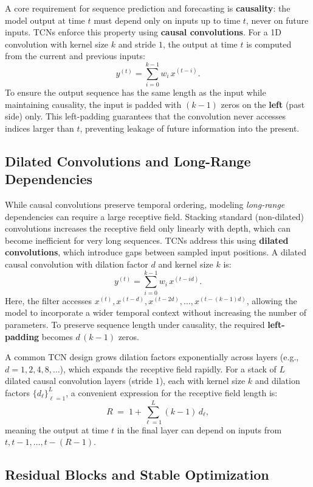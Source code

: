 \documentclass{article}
\begin{document}
A core requirement for sequence prediction and forecasting is \textbf{causality}: the model output at time $t$ must depend only on inputs up to time $t$, never on future inputs. TCNs enforce this property using \textbf{causal convolutions}. For a 1D convolution with kernel size $k$ and stride $1$, the output at time $t$ is computed from the current and previous inputs:
\[
y^{(t)} = \sum_{i=0}^{k-1} w_i \, x^{(t-i)}.
\]
To ensure the output sequence has the same length as the input while maintaining causality, the input is padded with $(k-1)$ zeros on the \textbf{left} (past side) only. This left-padding guarantees that the convolution never accesses indices larger than $t$, preventing leakage of future information into the present.

\subsection{Dilated Convolutions and Long-Range Dependencies}

While causal convolutions preserve temporal ordering, modeling \emph{long-range} dependencies can require a large receptive field. Stacking standard (non-dilated) convolutions increases the receptive field only linearly with depth, which can become inefficient for very long sequences. TCNs address this using \textbf{dilated convolutions}, which introduce gaps between sampled input positions. A dilated causal convolution with dilation factor $d$ and kernel size $k$ is:
\[
y^{(t)} = \sum_{i=0}^{k-1} w_i \, x^{(t-i d)}.
\]
Here, the filter accesses $x^{(t)}, x^{(t-d)}, x^{(t-2d)}, \dots, x^{(t-(k-1)d)}$, allowing the model to incorporate a wider temporal context without increasing the number of parameters. To preserve sequence length under causality, the required \textbf{left-padding} becomes $d\,(k-1)$ zeros.

A common TCN design grows dilation factors exponentially across layers (e.g., $d=1,2,4,8,\dots$), which expands the receptive field rapidly. For a stack of $L$ dilated causal convolution layers (stride $1$), each with kernel size $k$ and dilation factors $\{d_\ell\}_{\ell=1}^L$, a convenient expression for the receptive field length is:
\[
R \;=\; 1 + \sum_{\ell=1}^{L} (k-1)\,d_\ell,
\]
meaning the output at time $t$ in the final layer can depend on inputs from $t, t-1, \dots, t-(R-1)$.

\subsection{Residual Blocks and Stable Optimization}
\end{document}
